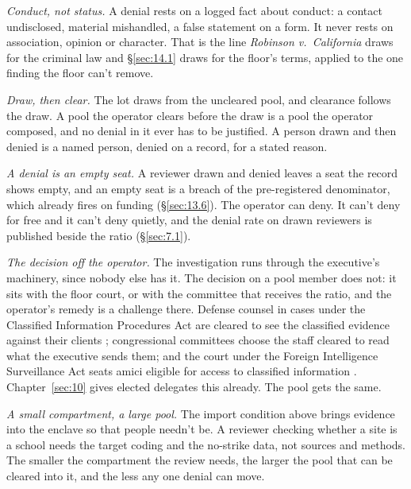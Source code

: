 \emph{Conduct, not status.} A denial rests on a logged fact about conduct: a contact undisclosed, material mishandled, a false statement on a form. It never rests on association, opinion or character. That is the line \emph{Robinson v.\ California} draws for the criminal law \autocite{robinson1962} and \S\ref{sec:14.1} draws for the floor's terms, applied to the one finding the floor can't remove.

\emph{Draw, then clear.} The lot draws from the uncleared pool, and clearance follows the draw. A pool the operator clears before the draw is a pool the operator composed, and no denial in it ever has to be justified. A person drawn and then denied is a named person, denied on a record, for a stated reason.

\emph{A denial is an empty seat.} A reviewer drawn and denied leaves a seat the record shows empty, and an empty seat is a breach of the pre-registered denominator, which already fires on funding (\S\ref{sec:13.6}). The operator can deny. It can't deny for free and it can't deny quietly, and the denial rate on drawn reviewers is published beside the ratio (\S\ref{sec:7.1}).

\emph{The decision off the operator.} The investigation runs through the executive's machinery, since nobody else has it. The decision on a pool member does not: it sits with the floor court, or with the committee that receives the ratio, and the operator's remedy is a challenge there. Defense counsel in cases under the Classified Information Procedures Act are cleared to see the classified evidence against their clients \autocite[\S\S\,3–4]{cipa1980}; congressional committees choose the staff cleared to read what the executive sends them; and the court under the Foreign Intelligence Surveillance Act seats amici eligible for access to classified information \autocite{usafreedom2015}. Chapter~\ref{sec:10} gives elected delegates this already. The pool gets the same.

\emph{A small compartment, a large pool.} The import condition above brings evidence into the enclave so that people needn't be. A reviewer checking whether a site is a school needs the target coding and the no-strike data, not sources and methods. The smaller the compartment the review needs, the larger the pool that can be cleared into it, and the less any one denial can move.
